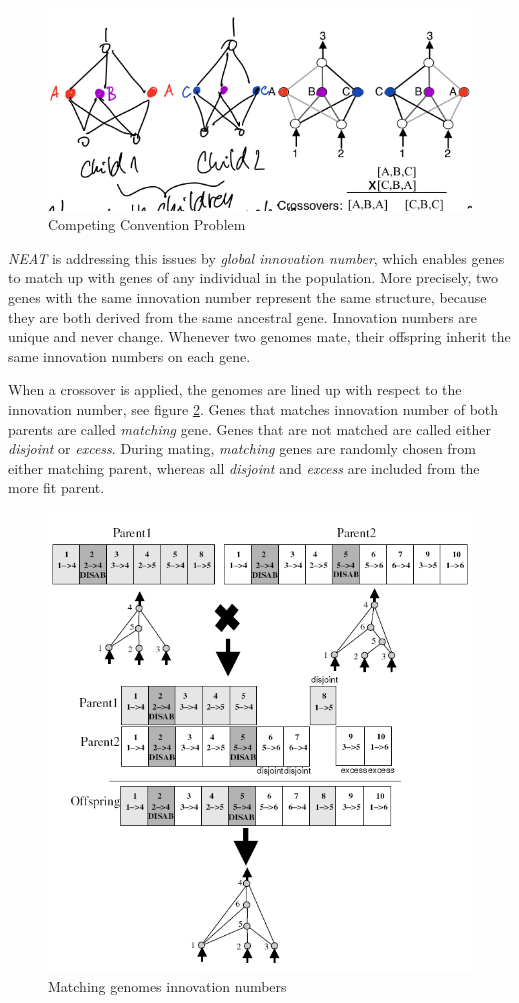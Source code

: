 \documentclass[format=acmsmall, review=false, screen=true]{acmart}
\begin{document}
\begin{figure}[H]
  \includegraphics[width=0.56\linewidth]{img/competing_convention.JPEG}
  \caption{\label{fig:competing_convention}Competing Convention Problem}
\end{figure}

\emph{NEAT} is addressing this issues by \emph{global innovation number}, which enables genes to match up with genes of any individual in the population. More precisely, two genes with the same innovation number represent the same structure, because they are both derived from the same ancestral gene. Innovation numbers are unique and never change. Whenever two genomes mate, their offspring inherit the same innovation numbers on each gene.

When a crossover is applied, the genomes are lined up with respect to the innovation number, see figure \ref{fig:crossover}. Genes that matches innovation number of both parents are called \emph{matching} gene. Genes that are not matched are called either \emph{disjoint} or \emph{excess}. During mating, \emph{matching} genes are randomly chosen from either matching parent, whereas all \emph{disjoint} and \emph{excess} are included from the more fit parent.

\begin{figure}[H]
  \includegraphics[width=0.5\linewidth]{img/crossover.PNG}
  \caption{\label{fig:crossover}Matching genomes innovation numbers}
\end{figure}
\end{document}
